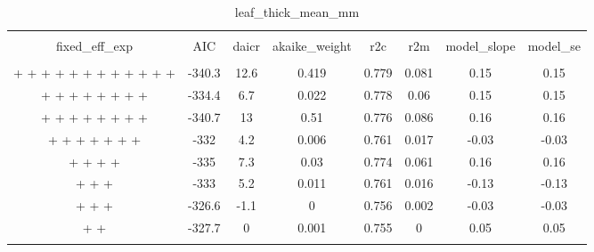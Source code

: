 
\begin{table}[!htbp] \centering 
  \caption{leaf_thick_mean_mm} 
  \label{leaf_thick_mean_mm} 
\begin{tabular}{@{\extracolsep{5pt}} cccccccc} 
\\[-1.8ex]\hline 
\hline \\[-1.8ex] 
fixed\_eff\_exp & AIC & daicr & akaike\_weight & r2c & r2m & model\_slope & model\_se \\ 
\hline \\[-1.8ex] 
 +  +  +  +  +  +  +  +  +  +  +  +  & -340.3 & 12.6 & 0.419 & 0.779 & 0.081 & 0.15 & 0.15 \\ 
 +  +  +  +  +  +  +  +  & -334.4 & 6.7 & 0.022 & 0.778 & 0.06 & 0.15 & 0.15 \\ 
 +  +  +  +  +  +  +  +  & -340.7 & 13 & 0.51 & 0.776 & 0.086 & 0.16 & 0.16 \\ 
 +  +  +  +  +  +  +  & -332 & 4.2 & 0.006 & 0.761 & 0.017 & -0.03 & -0.03 \\ 
 +  +  +  +  & -335 & 7.3 & 0.03 & 0.774 & 0.061 & 0.16 & 0.16 \\ 
 +  +  +  & -333 & 5.2 & 0.011 & 0.761 & 0.016 & -0.13 & -0.13 \\ 
 +  +  +  & -326.6 & -1.1 & 0 & 0.756 & 0.002 & -0.03 & -0.03 \\ 
 +  +  & -327.7 & 0 & 0.001 & 0.755 & 0 & 0.05 & 0.05 \\ 
\hline \\[-1.8ex] 
\end{tabular} 
\end{table} 
